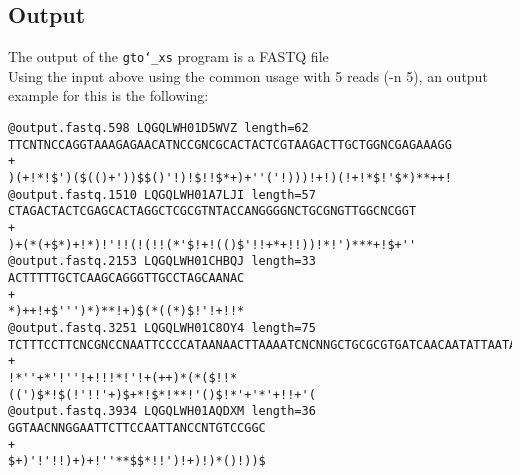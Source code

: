 \subsection*{Output}
The output of the \texttt{gto\char`_xs} program is a FASTQ file\\
Using the input above using the common usage with 5 reads (-n 5), an output example for this is the following:
\begin{lstlisting}
@output.fastq.598 LQGQLWH01D5WVZ length=62
TTCNTNCCAGGTAAAGAGAACATNCCGNCGCACTACTCGTAAGACTTGCTGGNCGAGAAAGG
+
)(+!*!$')($(()+'))$$()'!)!$!!$*+)+''('!)))!+!)(!+!*$!'$*)**++!
@output.fastq.1510 LQGQLWH01A7LJI length=57
CTAGACTACTCGAGCACTAGGCTCGCGTNTACCANGGGGNCTGCGNGTTGGCNCGGT
+
)+(*(+$*)+!*)!'!!(!(!!(*'$!+!(()$'!!+*+!!))!*!')***+!$+''
@output.fastq.2153 LQGQLWH01CHBQJ length=33
ACTTTTTGCTCAAGCAGGGTTGCCTAGCAANAC
+
*)++!+$''')*)**!+)$(*((*)$!'!+!!*
@output.fastq.3251 LQGQLWH01C8OY4 length=75
TCTTTCCTTCNCGNCCNAATTCCCCATAANAACTTAAAATCNCNNGCTGCGCGTGATCAACAATATTAATACTCC
+
!*''+*'!''!+!!!*!'!+(++)*(*($!!*((')$*!$(!'!!'+)$+*!$*!**!'()$!*'+'*'+!!+'(
@output.fastq.3934 LQGQLWH01AQDXM length=36
GGTAACNNGGAATTCTTCCAATTANCCNTGTCCGGC
+
$+)'!'!!)+)+!''**$$*!!')!+)!)*()!))$
\end{lstlisting}
